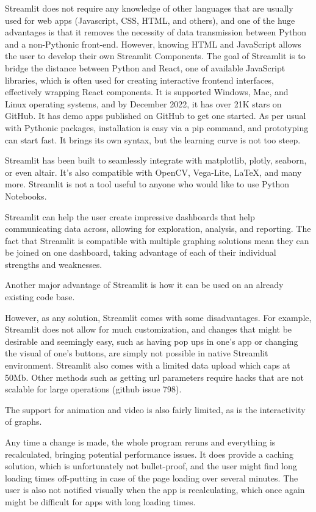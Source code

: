 Streamlit does not require any knowledge of other languages that are usually used for web apps (Javascript, CSS, HTML, and others), and one of the huge advantages is that it removes the necessity of data transmission between Python and a non-Pythonic front-end. However, knowing HTML and JavaScript allows the user to develop their own Streamlit Components. The goal of Streamlit is to bridge the distance between Python and React, one of available JavaScript libraries, which is often used for creating interactive frontend interfaces, effectively wrapping React components. It is supported Windows, Mac, and Linux operating systems, and by December 2022, it has over 21K stars on GitHub. It has demo apps published on GitHub to get one started. As per usual with Pythonic packages, installation is easy via a pip command, and prototyping can start fast. It brings its own syntax, but the learning curve is not too steep. 

Streamlit has been built to seamlessly integrate with matplotlib, plotly, seaborn, or even altair. It's also compatible with OpenCV, Vega-Lite, LaTeX, and many more. Streamlit is not a tool useful to anyone who would like to use Python Notebooks.

Streamlit can help the user create impressive dashboards that help communicating data across, allowing for exploration, analysis, and reporting. The fact that Streamlit is compatible with multiple graphing solutions mean they can be joined on one dashboard, taking advantage of each of their individual strengths and weaknesses. 

Another major advantage of Streamlit is how it can be used on an already existing code base.

However, as any solution, Streamlit comes with some disadvantages. For example, Streamlit does not allow for much customization, and changes that might be desirable and seemingly easy, such as having pop ups in one's app or changing the visual of one's buttons, are simply not possible in native Streamlit environment. Streamlit also comes with a limited data upload which caps at 50Mb. Other methods such as getting url parameters require hacks that are not scalable for large operations (github issue 798). 

The support for animation and video is also fairly limited, as is the interactivity of graphs. 

Any time a change is made, the whole program reruns and everything is recalculated, bringing potential performance issues. It does provide a caching solution, which is unfortunately not bullet-proof, and the user might find long loading times off-putting in case of the page loading over several minutes. The user is also not notified visually when the app is recalculating, which once again might be difficult for apps with long loading times.


